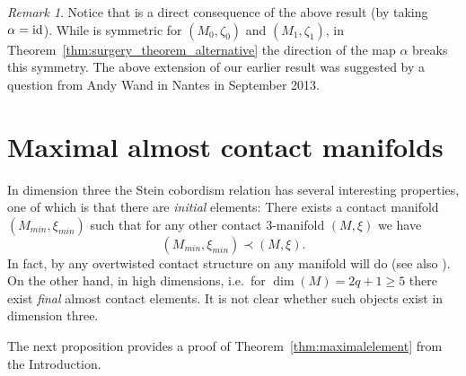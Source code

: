 \documentclass[12pt]{amsart}
\theoremstyle{remark}
\newtheorem{Remark}[Theorem]{Remark}
\newcommand{\ascomm}[1]{\begingroup\color{red}AS:~#1\endgroup}
\begin{document}
\begin{Remark}
Notice that \cite[Theorem~3.8]{BCS2} is a direct consequence of the above result (by taking
$\alpha ={\rm id}$). While \cite[Theorem~3.8]{BCS2} is symmetric for 
$(M_0, \zeta _0)$ and $(M_1, \zeta _1)$, in Theorem~\ref{thm:surgery_theorem_alternative} 
the direction
of the map $\alpha$ breaks this symmetry.
The above extension of our earlier result  was suggested by a question from 
Andy Wand in Nantes in September 2013.
\end{Remark}


\section{Maximal almost contact manifolds}
\label{sec:max}

In dimension three the Stein cobordism relation has several interesting
properties, one of which is that there are \emph{initial} elements: There
exists a contact manifold $(M_{min},\xi_{min})$ such that for any other contact 3-manifold
 $(M, \xi )$ we have 
$$(M_{min},\xi_{min}) \prec (M,\xi).$$ 
In fact, by \cite{EtHond} any overtwisted contact
structure on any manifold will do (see also \cite{GeigesZemisch}). On the other hand, in
high dimensions, i.e.\ for $\dim (M) = 2q{+}1 \ge 5$ there exist
\emph{final} almost contact elements. It is not clear whether such objects exist in
dimension three.

The next proposition provides a proof of
Theorem~\ref{thm:maximalelement} from the Introduction.
\end{document}
